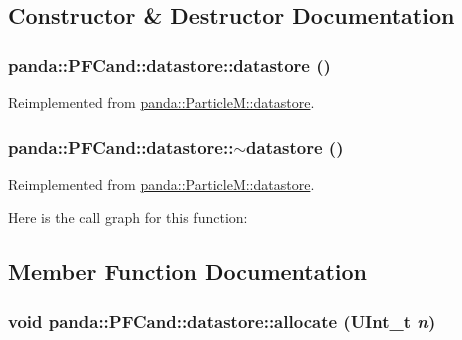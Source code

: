 \subsection{Constructor \& Destructor Documentation}
\hypertarget{structpanda_1_1PFCand_1_1datastore_a43d1760f6d3b403fea68a112cca0b2a7}{
\subsubsection[{datastore}]{\setlength{\rightskip}{0pt plus 5cm}panda::PFCand::datastore::datastore ()}}
\label{structpanda_1_1PFCand_1_1datastore_a43d1760f6d3b403fea68a112cca0b2a7}


Reimplemented from \hyperlink{structpanda_1_1ParticleM_1_1datastore_acc9af307e2c4fee9bc5d9bbb37ad6124}{panda::ParticleM::datastore}.\hypertarget{structpanda_1_1PFCand_1_1datastore_af62f03093f0dd1177468df953265e198}{
\subsubsection[{$\sim$datastore}]{\setlength{\rightskip}{0pt plus 5cm}panda::PFCand::datastore::$\sim$datastore ()}}
\label{structpanda_1_1PFCand_1_1datastore_af62f03093f0dd1177468df953265e198}


Reimplemented from \hyperlink{structpanda_1_1ParticleM_1_1datastore_ae068980c20730bc8565d2f7ea701bc5e}{panda::ParticleM::datastore}.

Here is the call graph for this function:

\subsection{Member Function Documentation}
\hypertarget{structpanda_1_1PFCand_1_1datastore_af5aef7147e657b4f1b4125f3dae0dc39}{
\subsubsection[{allocate}]{\setlength{\rightskip}{0pt plus 5cm}void panda::PFCand::datastore::allocate (UInt\_\-t {\em n})}}
\label{structpanda_1_1PFCand_1_1datastore_af5aef7147e657b4f1b4125f3dae0dc39}


